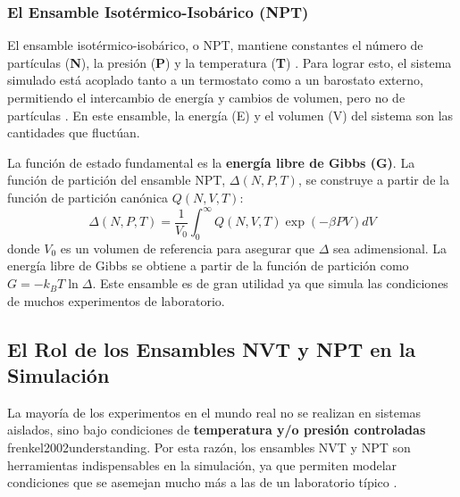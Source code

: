 \subsubsection{El Ensamble Isotérmico-Isobárico (NPT)}

El ensamble isotérmico-isobárico, o NPT, mantiene constantes el número de partículas (\textbf{N}), la presión (\textbf{P}) y la temperatura (\textbf{T}) \cite[98]{zhou2022molecular}. Para lograr esto, el sistema simulado está acoplado tanto a un termostato como a un barostato externo, permitiendo el intercambio de energía y cambios de volumen, pero no de partículas \cite[98]{zhou2022molecular}. En este ensamble, la energía (E) y el volumen (V) del sistema son las cantidades que fluctúan.

La función de estado fundamental es la \textbf{energía libre de Gibbs (G)}. La función de partición del ensamble NPT, $\Delta(N,P,T)$, se construye a partir de la función de partición canónica $Q(N,V,T)$:
$$ \Delta(N,P,T) = \frac{1}{V_0} \int_0^\infty Q(N,V,T) \exp(-\beta PV) dV $$
donde $V_0$ es un volumen de referencia para asegurar que $\Delta$ sea adimensional. La energía libre de Gibbs se obtiene a partir de la función de partición como $G = -k_B T \ln \Delta$. Este ensamble es de gran utilidad ya que simula las condiciones de muchos experimentos de laboratorio.

\subsection{El Rol de los Ensambles NVT y NPT en la Simulación}

La mayoría de los experimentos en el mundo real no se realizan en sistemas aislados, sino bajo condiciones de \textbf{temperatura y/o presión controladas} \cite[105, 209]{allen2012computer}{frenkel2002understanding}. Por esta razón, los ensambles NVT y NPT son herramientas indispensables en la simulación, ya que permiten modelar condiciones que se asemejan mucho más a las de un laboratorio típico \cite[98, 100]{zhou2022molecular}.

